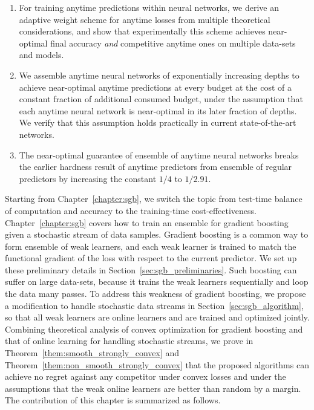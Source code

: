 \begin{enumerate}[resume]
\item For training anytime predictions within neural networks, we derive an adaptive weight scheme for anytime losses from multiple theoretical considerations, and show that experimentally this scheme achieves near-optimal final accuracy \emph{and} competitive anytime ones on multiple data-sets and models.
\item We assemble anytime neural networks of exponentially increasing depths to achieve near-optimal anytime predictions at every budget at the cost of a constant fraction of additional consumed budget, under the assumption that each anytime neural network is near-optimal in its later fraction of depths. We verify that this assumption holds practically in current state-of-the-art networks.
\item The near-optimal guarantee of ensemble of anytime neural networks breaks the earlier hardness result of anytime predictors from ensemble of regular predictors by increasing the constant $1/4$ to $1/2.91$.
\end{enumerate}

Starting from Chapter~\ref{chapter:sgb}, we switch the topic from test-time balance of computation and accuracy to the training-time cost-effectiveness. Chapter~\ref{chapter:sgb} covers how to train an ensemble for gradient boosting given a stochastic stream of data samples. Gradient boosting is a common way to form ensemble of weak learners, and each weak learner is trained to match the functional gradient of the loss with respect to the current predictor. We set up these preliminary details in Section~\ref{sec:sgb_preliminaries}. Such boosting can suffer on large data-sets, because it trains the weak learners sequentially and loop the data many passes. To address this weakness of gradient boosting, we propose a modification to handle stochastic data streams in Section~\ref{sec:sgb_algorithm}, so that all weak learners are online learners and are trained and optimized jointly. Combining theoretical analysis of convex optimization for gradient boosting and that of online learning for handling stochastic streams, we prove in Theorem~\ref{them:smooth_strongly_convex} and Theorem~\ref{them:non_smooth_strongly_convex} that the proposed algorithms can achieve no regret against any competitor under convex losses and under the assumptions that the weak online learners are better than random by a margin. 
The contribution of this chapter is summarized as follows.

